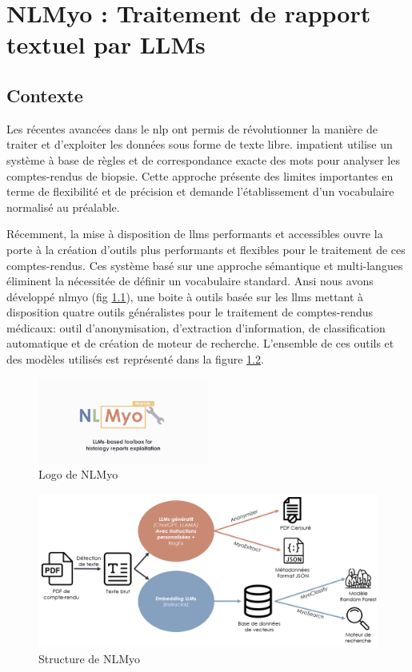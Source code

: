 \chapter{NLMyo : Traitement de rapport textuel par LLMs}

\section{Contexte}
Les récentes avancées dans le \gls{nlp} ont permis de révolutionner la manière de traiter et d'exploiter les données sous forme de texte libre. \gls{impatient} utilise un système à base de règles et de correspondance exacte des mots pour analyser les comptes-rendus de biopsie. Cette approche présente des limites importantes en terme de flexibilité et de précision et demande l'établissement d'un vocabulaire normalisé au préalable. 

Récemment, la mise à disposition de \gls{llms} performants et accessibles ouvre la porte à la création d'outils plus performants et flexibles pour le traitement de ces comptes-rendus. Ces système basé sur une approche sémantique et multi-langues éliminent la nécessitée de définir un vocabulaire standard. Ansi nous avons développé \gls{nlmyo} (fig \ref{fig:nlmyo_logo}), une boite à outils basée sur les \gls{llms} mettant à disposition quatre outils généralistes pour le traitement de comptes-rendus médicaux: outil d'anonymisation, d'extraction d'information, de classification automatique et de création de moteur de recherche. L'ensemble de ces outils et des modèles utilisés est représenté dans la figure \ref{fig:nlmyo_struct}.
\begin{figure}[htbp]
 \centering
 \includegraphics[width=0.5\textwidth]{figures/nlmyo_banner.png}
 \caption[Logo NLMyo]{Logo de NLMyo}
 \label{fig:nlmyo_logo}
\end{figure}
\begin{figure}[htbp]
 \centering
 \includegraphics[width=1\textwidth]{figures/nlmyo_struct.png}
 \caption[Structure de NLMyo]{Structure de NLMyo}
 \label{fig:nlmyo_struct}
\end{figure}
